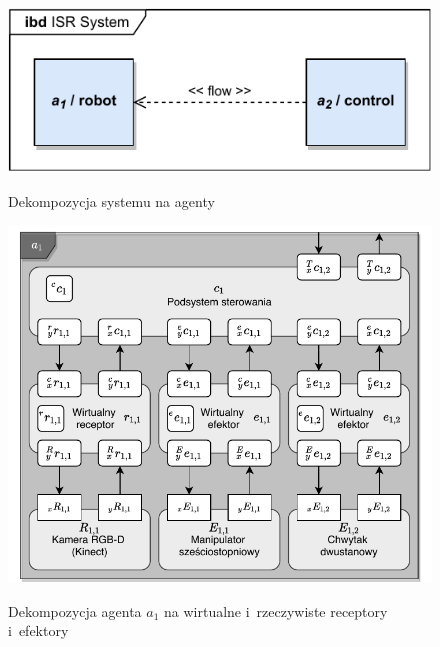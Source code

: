 \begin{figure}
    \centering
    \includegraphics[width=\columnwidth]{figures/ISR-agents.pdf}
    \label{fig:dekompozycja-agent-1}
    \caption{Dekompozycja systemu na agenty}
\end{figure}

\begin{figure}
    \centering
    \includegraphics[width=\columnwidth]{figures/ISR-agent-decomposition.pdf}
    \label{fig:dekompozycja-agent-1}
    \caption{Dekompozycja agenta $a_{1}$ na wirtualne i~rzeczywiste receptory i~efektory}
\end{figure}
